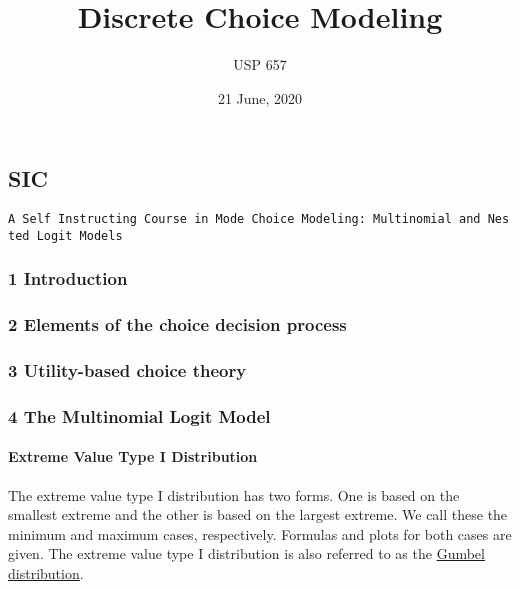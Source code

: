 \documentclass[
]{article}
\title{Discrete Choice Modeling}
\subtitle{USP 657}
\author{}
\date{\vspace{-2.5em}21 June, 2020}
\begin{document}
\maketitle

\hypertarget{section}{%
\section{}\label{section}}

\hypertarget{sic}{%
\subsection{SIC}\label{sic}}

\texttt{A\ Self\ Instructing\ Course\ in\ Mode\ Choice\ Modeling:\ Multinomial\ and\ Nested\ Logit\ Models}

\hypertarget{introduction}{%
\subsubsection{1 Introduction}\label{introduction}}

\hypertarget{elements-of-the-choice-decision-process}{%
\subsubsection{2 Elements of the choice decision
process}\label{elements-of-the-choice-decision-process}}

\hypertarget{utility-based-choice-theory}{%
\subsubsection{3 Utility-based choice
theory}\label{utility-based-choice-theory}}

\hypertarget{the-multinomial-logit-model}{%
\subsubsection{4 The Multinomial Logit
Model}\label{the-multinomial-logit-model}}

\hypertarget{extreme-value-type-i-distribution}{%
\paragraph{Extreme Value Type I
Distribution}\label{extreme-value-type-i-distribution}}

The extreme value type I distribution has two forms. One is based on the
smallest extreme and the other is based on the largest extreme. We call
these the minimum and maximum cases, respectively. Formulas and plots
for both cases are given. The extreme value type I distribution is also
referred to as the
\href{https://www.itl.nist.gov/div898/handbook/eda/section3/eda366g.htm}{Gumbel
distribution}.
\end{document}
